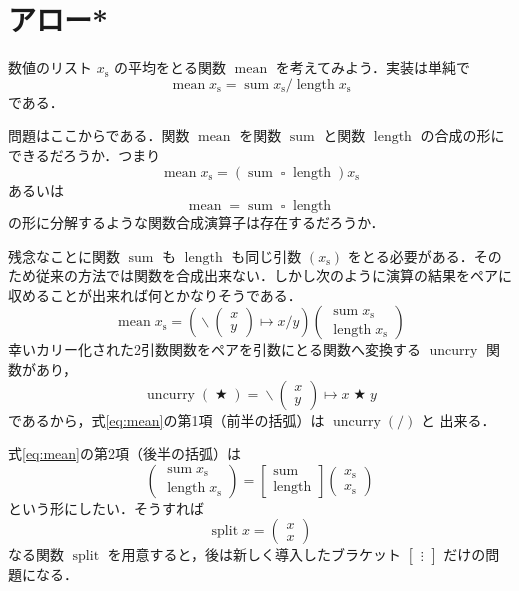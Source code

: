 \documentclass[a5paper,twoside,fleqn,draft]{jsbook}
\newcommand{\mSpecialFunc}[1]{\mathrm{#1}}
\DeclareMathOperator{\mLength}{\mSpecialFunc{length}}
\DeclareMathOperator{\mMean}{\mSpecialFunc{mean}}
\DeclareMathOperator{\mSplit}{\mSpecialFunc{split}}
\DeclareMathOperator{\mSum}{\mSpecialFunc{sum}}
\DeclareMathOperator{\mUncurry}{\mSpecialFunc{uncurry}}
\DeclareMathOperator{\mBinOp}{\bigstar}
\DeclareMathOperator{\mLambda}{\backslash}
\DeclareMathOperator{\mLambdaArrow}{\mapsto}
\DeclareMathOperator{\mSomeOp}{\square}
\newcommand{\mPairWith}[2]{\begin{pmatrix}#1\\#2\end{pmatrix}}
\newcommand{\mList}[1]{{#1}_\mathrm{s}}
\begin{document}
\section{アロー*}

数値のリスト $\mList{x}$ の平均をとる関数 $\mMean$ を考えてみよう．実装は単純で
\begin{equation}
  \mMean\mList{x}
  =\mSum\mList{x}/\mLength\mList{x}
\end{equation}
である．

問題はここからである．関数 $\mMean$ を関数 $\mSum$ と関数 $\mLength$ の合成の形にできるだろうか．つまり
\begin{equation}
  \mMean\mList{x}
  =(\mSum\mSomeOp\mLength)\mList{x}
\end{equation}
あるいは
\begin{equation}
  \mMean
  =\mSum\mSomeOp\mLength
\end{equation}
の形に分解するような関数合成演算子は存在するだろうか．

残念なことに関数 $\mSum$ も $\mLength$ も同じ引数 $(\mList{x})$ をとる必要がある．そのため従来の方法では関数を合成出来ない．しかし次のように演算の結果をペアに収めることが出来れば何とかなりそうである．
\begin{equation}
  \label{eq:mean}
  \mMean\mList{x}
  =
  \left(\mLambda\mPairWith{x}{y}\mLambdaArrow x/y\right)\mPairWith{\mSum\mList{x}}{\mLength\mList{x}}
\end{equation}
幸いカリー化された2引数関数をペアを引数にとる関数へ変換する
$\mUncurry$ 関数があり，
\begin{equation}
  \mUncurry(\mBinOp)
  =\mLambda\mPairWith{x}{y}\mLambdaArrow x\mBinOp y
\end{equation}
であるから，式\eqref{eq:mean}の第1項（前半の括弧）は $\mUncurry(/)$ と
出来る．

式\eqref{eq:mean}の第2項（後半の括弧）は
\begin{equation}
  \mPairWith{\mSum\mList{x}}{\mLength\mList{x}}
  =\begin{bmatrix}
  \mSum\\
  \mLength
  \end{bmatrix}
  \mPairWith{\mList{x}}{\mList{x}}
\end{equation}
という形にしたい．そうすれば
\begin{equation}
  \mSplit x
  =\mPairWith{x}{x}
\end{equation}
なる関数 $\mSplit$ を用意すると，後は新しく導入したブラケット
$\begin{bmatrix}\vdots\end{bmatrix}$ だけの問題になる．
\end{document}
